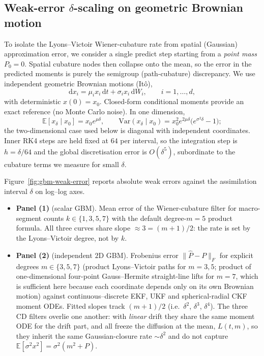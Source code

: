 \subsection*{Weak-error $\delta$-scaling on geometric Brownian motion}
\label{sec:gbm-weak-error}  %

To isolate the Lyons--Victoir Wiener-cubature rate from spatial (Gaussian)
approximation error, we consider a single predict step starting from a
\emph{point mass} $P_0=0$. Spatial cubature nodes then collapse onto the
mean, so the error in the predicted moments is purely the semigroup
(path-cubature) discrepancy. We use independent geometric Brownian motions
(It\^o),
\begin{equation}
  \mathrm{d}x_i
  = \mu_i x_i\,\mathrm{d}t
  + \sigma_i x_i\,\mathrm{d}W_i,
  \qquad i=1,\ldots,d,
\end{equation}
with deterministic $x(0)=x_0$. Closed-form conditional moments provide an
exact reference (no Monte Carlo noise). In one dimension,
\[
  \mathbb{E}[x_\delta\mid x_0]
  = x_0 e^{\mu\delta},
  \qquad
  \mathrm{Var}(x_\delta\mid x_0)
  = x_0^2 e^{2\mu\delta}\bigl(e^{\sigma^2\delta}-1\bigr);
\]
the two-dimensional case used below is diagonal with independent coordinates.
Inner RK4 steps are held fixed at $64$ per interval, so the integration step
is $h=\delta/64$ and the global discretisation error is
$O(\delta^5)$, subordinate to the cubature terms we measure for small $\delta$.

Figure~\ref{fig:gbm-weak-error} reports absolute weak errors against the
assimilation interval $\delta$ on log--log axes.
\begin{itemize}
  \item \textbf{Panel (1)} (scalar GBM).
  Mean error of the Wiener-cubature filter for macro-segment counts
  $k\in\{1,3,5,7\}$ with the default degree-$m{=}5$ product formula.
  All three curves share slope $\approx 3=(m{+}1)/2$: the rate is set by the
  Lyons--Victoir degree, not by $k$.

  \item \textbf{Panel (2)} (independent $2$D GBM).
  Frobenius error $\|\widehat{P}-P\|_F$ for explicit degrees
  $m\in\{3,5,7\}$ (product Lyons--Victoir paths for $m{=}3,5$; product of
  one-dimensional four-point Gauss--Hermite straight-line lifts for $m{=}7$,
  which is sufficient here because each coordinate depends only on its own
  Brownian motion) against continuous--discrete EKF, UKF and spherical-radial
  CKF moment ODEs. Fitted slopes track $(m{+}1)/2$ (i.e.\ $\delta^2$,
  $\delta^3$, $\delta^4$). The three CD filters overlie one another: with
  \emph{linear} drift they share the same moment ODE for the drift part, and
  all freeze the diffusion at the mean, $L(t,m)$, so they inherit the same
  Gaussian-closure rate $\sim\delta^2$ and do not capture
  $\mathbb{E}[\sigma^2 x^2]=\sigma^2(m^2+P)$.
\end{itemize}

